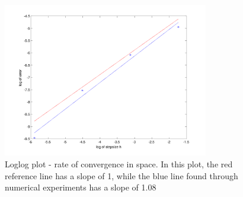 \begin{figure}[h]
        \centering
        \includegraphics[width=0.8\textwidth]{gfx/loglog}
        \caption{Loglog plot - rate of convergence in space. In this plot, the red reference line has a slope of 1, while the blue line found through numerical experiments has a slope of 1.08}
        \label{fig:loglog}
\end{figure}
